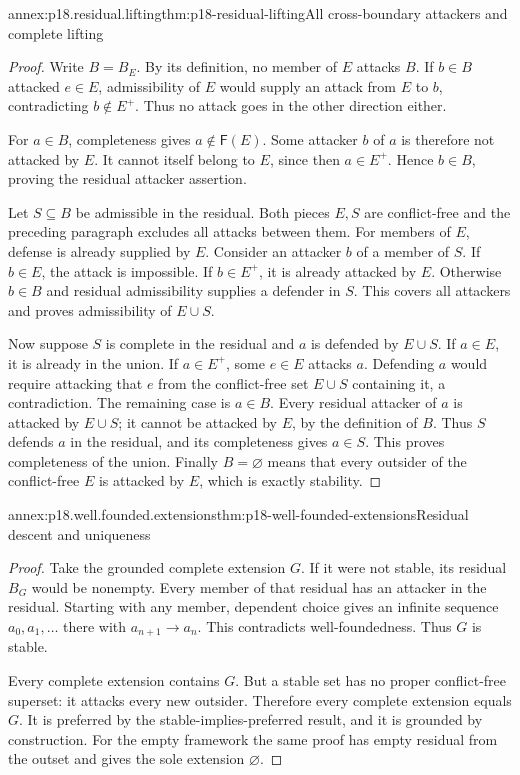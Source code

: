 \begin{annexitem}{annex:p18.residual.lifting}{thm:p18-residual-lifting}{All cross-boundary attackers and complete lifting}
\begin{proof}
Write \(B=B_E\). By its definition,
no member of \(E\) attacks \(B\).
If \(b\in B\) attacked \(e\in E\),
admissibility of \(E\) would supply
an attack from \(E\) to \(b\),
contradicting \(b\notin E^+\).
Thus no attack goes in the
other direction either.

For \(a\in B\), completeness
gives \(a\notin\mathsf F(E)\).
Some attacker \(b\) of \(a\)
is therefore not attacked
by \(E\). It cannot itself
belong to \(E\), since
then \(a\in E^+\).
Hence \(b\in B\), proving
the residual attacker assertion.

Let \(S\subseteq B\) be
admissible in the residual.
Both pieces \(E,S\) are
conflict-free and the
preceding paragraph excludes
all attacks between them.
For members of \(E\), defense
is already supplied by \(E\).
Consider an attacker \(b\)
of a member of \(S\).
If \(b\in E\), the attack
is impossible. If \(b\in E^+\),
it is already attacked by
\(E\). Otherwise \(b\in B\)
and residual admissibility
supplies a defender in \(S\).
This covers all attackers
and proves admissibility
of \(E\cup S\).

Now suppose \(S\) is complete
in the residual and \(a\)
is defended by \(E\cup S\).
If \(a\in E\), it is
already in the union.
If \(a\in E^+\), some
\(e\in E\) attacks \(a\).
Defending \(a\) would
require attacking that
\(e\) from the conflict-free
set \(E\cup S\) containing
it, a contradiction.
The remaining case is
\(a\in B\). Every residual
attacker of \(a\) is
attacked by \(E\cup S\);
it cannot be attacked
by \(E\), by the
definition of \(B\).
Thus \(S\) defends \(a\)
in the residual, and
its completeness gives
\(a\in S\). This proves
completeness of the union.
Finally \(B=\varnothing\)
means that every outsider
of the conflict-free \(E\)
is attacked by \(E\),
which is exactly stability.
\end{proof}
\end{annexitem}

\begin{annexitem}{annex:p18.well.founded.extensions}{thm:p18-well-founded-extensions}{Residual descent and uniqueness}
\begin{proof}
Take the grounded complete
extension \(G\). If it were
not stable, its residual
\(B_G\) would be nonempty.
Every member of that
residual has an attacker
in the residual. Starting
with any member, dependent
choice gives an infinite
sequence \(a_0,a_1,\ldots\)
there with \(a_{n+1}\to a_n\).
This contradicts well-foundedness.
Thus \(G\) is stable.

Every complete extension
contains \(G\). But a
stable set has no proper
conflict-free superset:
it attacks every new
outsider. Therefore every
complete extension equals
\(G\). It is preferred
by the stable-implies-preferred
result, and it is grounded
by construction. For the
empty framework the same
proof has empty residual
from the outset and
gives the sole extension
\(\varnothing\).
\end{proof}
\end{annexitem}

